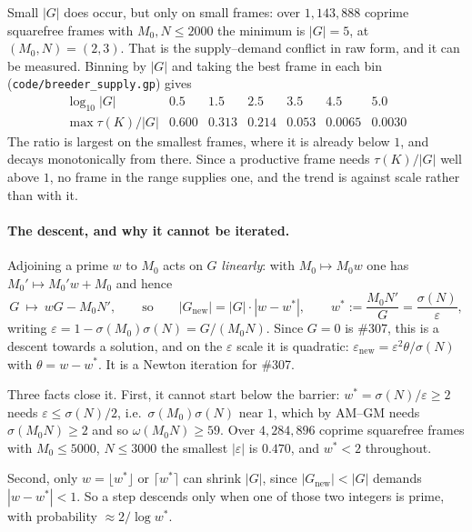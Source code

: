 \documentclass[11pt]{article}
\theoremstyle{definition}
\begin{document}
Small $|G|$ does occur, but only on small frames: over $1{,}143{,}888$ coprime squarefree frames with
$M_0,N\le2000$ the minimum is $|G|=5$, at $(M_0,N)=(2,3)$. That is the supply--demand conflict in raw
form, and it can be measured. Binning by $|G|$ and taking the best frame in each bin
(\texttt{code/breeder\_supply.gp}) gives
\[
\begin{array}{l|cccccc}
\log_{10}|G| & 0.5 & 1.5 & 2.5 & 3.5 & 4.5 & 5.0\\\hline
\max \tau(K)/|G| & 0.600 & 0.313 & 0.214 & 0.053 & 0.0065 & 0.0030
\end{array}
\]
The ratio is largest on the smallest frames, where it is already below $1$, and decays monotonically
from there. Since a productive frame needs $\tau(K)/|G|$ well above $1$, no frame in the range
supplies one, and the trend is against scale rather than with it.

\paragraph{The descent, and why it cannot be iterated.} Adjoining a prime $w$ to $M_0$ acts on
$G$ \emph{linearly}: with $M_0\mapsto M_0w$ one has $M_0'\mapsto M_0'w+M_0$ and hence
\[ G\ \longmapsto\ wG-M_0N', \qquad\text{so}\qquad |G_{\mathrm{new}}|=|G|\cdot|w-w^{*}|,
   \qquad w^{*}:=\frac{M_0N'}{G}=\frac{\sigma(N)}{\varepsilon}, \]
writing $\varepsilon=1-\sigma(M_0)\sigma(N)=G/(M_0N)$. Since $G=0$ is \#307, this is a descent
towards a solution, and on the $\varepsilon$ scale it is quadratic: $\varepsilon_{\mathrm{new}}
=\varepsilon^{2}\theta/\sigma(N)$ with $\theta=w-w^{*}$. It is a Newton iteration for \#307.

Three facts close it. First, it cannot start below the barrier: $w^{*}=\sigma(N)/\varepsilon\ge2$
needs $\varepsilon\le\sigma(N)/2$, i.e.\ $\sigma(M_0)\sigma(N)$ near $1$, which by AM--GM needs
$\sigma(M_0N)\ge2$ and so $\omega(M_0N)\ge59$. Over $4{,}284{,}896$ coprime squarefree frames with
$M_0\le5000$, $N\le3000$ the smallest $|\varepsilon|$ is $0.470$, and $w^{*}<2$ throughout.

Second, only $w=\lfloor w^{*}\rfloor$ or $\lceil w^{*}\rceil$ can shrink $|G|$, since
$|G_{\mathrm{new}}|<|G|$ demands $|w-w^{*}|<1$. So a step descends only when one of those two
integers is prime, with probability $\approx2/\log w^{*}$.
\end{document}

